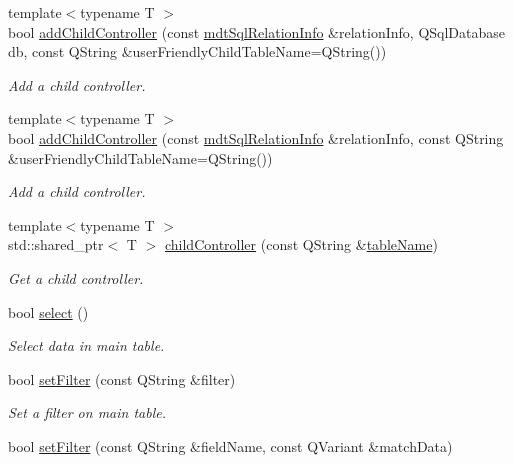 \begin{DoxyCompactItemize}
{\footnotesize template$<$typename T $>$ }\\bool \hyperlink{classmdt_abstract_sql_table_controller_a448966fc2696cc2cef31f4663ccde662}{add\-Child\-Controller} (const \hyperlink{classmdt_sql_relation_info}{mdt\-Sql\-Relation\-Info} \&relation\-Info, Q\-Sql\-Database db, const Q\-String \&user\-Friendly\-Child\-Table\-Name=Q\-String())
\begin{DoxyCompactList}\small\item\em Add a child controller. \end{DoxyCompactList}\item 
{\footnotesize template$<$typename T $>$ }\\bool \hyperlink{classmdt_abstract_sql_table_controller_a9ca5ec3bd1c98e7b5576de86712f220b}{add\-Child\-Controller} (const \hyperlink{classmdt_sql_relation_info}{mdt\-Sql\-Relation\-Info} \&relation\-Info, const Q\-String \&user\-Friendly\-Child\-Table\-Name=Q\-String())
\begin{DoxyCompactList}\small\item\em Add a child controller. \end{DoxyCompactList}\item 
{\footnotesize template$<$typename T $>$ }\\std\-::shared\-\_\-ptr$<$ T $>$ \hyperlink{classmdt_abstract_sql_table_controller_a4096d1eca87219a9abe4ab3e90943d81}{child\-Controller} (const Q\-String \&\hyperlink{classmdt_abstract_sql_table_controller_aaf864d069aeb74068b6daa747b740944}{table\-Name})
\begin{DoxyCompactList}\small\item\em Get a child controller. \end{DoxyCompactList}\item 
bool \hyperlink{classmdt_abstract_sql_table_controller_ae26ede862ac54ece9243b264ea22cefb}{select} ()
\begin{DoxyCompactList}\small\item\em Select data in main table. \end{DoxyCompactList}\item 
bool \hyperlink{classmdt_abstract_sql_table_controller_a28b24065dc465fdc0944464708adf63f}{set\-Filter} (const Q\-String \&filter)
\begin{DoxyCompactList}\small\item\em Set a filter on main table. \end{DoxyCompactList}\item 
bool \hyperlink{classmdt_abstract_sql_table_controller_aab3bc0fe028e133fe3f79a16907b41f5}{set\-Filter} (const Q\-String \&field\-Name, const Q\-Variant \&match\-Data)

\end{DoxyCompactItemize}
